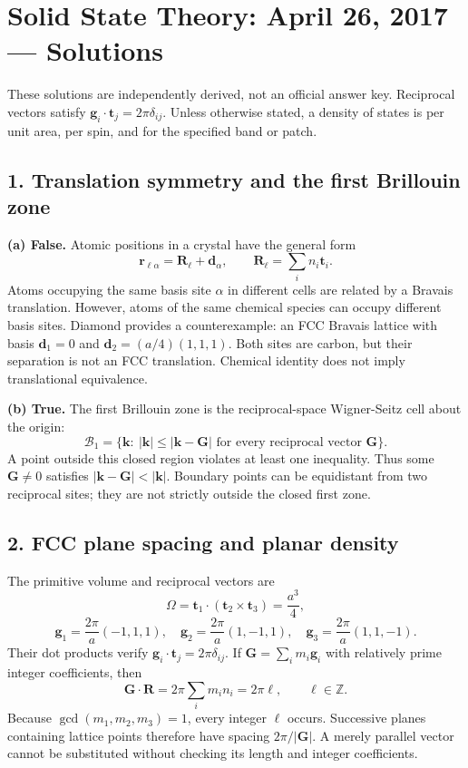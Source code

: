 \chapter{Solid State Theory: April 26, 2017 --- Solutions}
\label{s:theory-2017-04-midterm}
\begin{sourceNote}
These solutions are independently derived, not an official answer key. Reciprocal vectors satisfy $\mathbf g_i\cdot\mathbf t_j=2\pi\delta_{ij}$. Unless otherwise stated, a density of states is per unit area, per spin, and for the specified band or patch.
\end{sourceNote}

\section*{1. Translation symmetry and the first Brillouin zone}
\textbf{(a) False.} Atomic positions in a crystal have the general form
\[
\mathbf r_{\ell\alpha}=\mathbf R_\ell+\mathbf d_\alpha,\qquad
\mathbf R_\ell=\sum_i n_i\mathbf t_i.
\]
Atoms occupying the same basis site $\alpha$ in different cells are related by a Bravais translation. However, atoms of the same chemical species can occupy different basis sites. Diamond provides a counterexample: an FCC Bravais lattice with basis $\mathbf d_1=0$ and $\mathbf d_2=(a/4)(1,1,1)$. Both sites are carbon, but their separation is not an FCC translation. Chemical identity does not imply translational equivalence.

\textbf{(b) True.} The first Brillouin zone is the reciprocal-space Wigner-Seitz cell about the origin:
\[
\mathcal B_1=\{\mathbf k:\ |\mathbf k|\leq |\mathbf k-\mathbf G|
\text{ for every reciprocal vector }\mathbf G\}.
\]
A point outside this closed region violates at least one inequality. Thus some $\mathbf G\neq0$ satisfies $|\mathbf k-\mathbf G|<|\mathbf k|$. Boundary points can be equidistant from two reciprocal sites; they are not strictly outside the closed first zone.

\section*{2. FCC plane spacing and planar density}
The primitive volume and reciprocal vectors are
\[
\Omega=\mathbf t_1\cdot(\mathbf t_2\times\mathbf t_3)=\frac{a^3}{4},
\]
\[
\mathbf g_1=\frac{2\pi}{a}(-1,1,1),\quad
\mathbf g_2=\frac{2\pi}{a}(1,-1,1),\quad
\mathbf g_3=\frac{2\pi}{a}(1,1,-1).
\]
Their dot products verify $\mathbf g_i\cdot\mathbf t_j=2\pi\delta_{ij}$. If $\mathbf G=\sum_i m_i\mathbf g_i$ with relatively prime integer coefficients, then
\[
\mathbf G\cdot\mathbf R=2\pi\sum_i m_i n_i=2\pi\ell,\qquad \ell\in\mathbb Z.
\]
Because $\gcd(m_1,m_2,m_3)=1$, every integer $\ell$ occurs. Successive planes containing lattice points therefore have spacing $2\pi/|\mathbf G|$. A merely parallel vector cannot be substituted without checking its length and integer coefficients.

